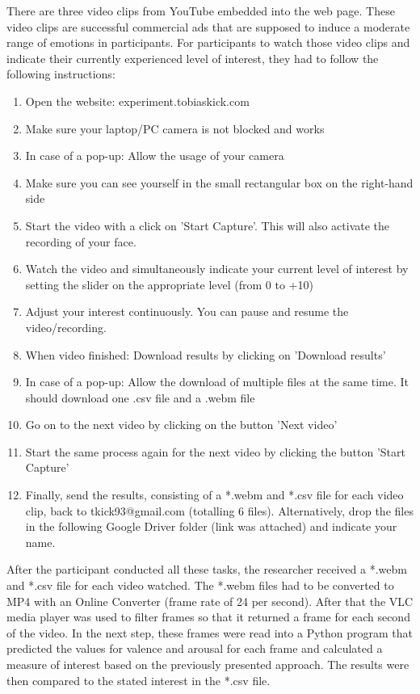 There are three video clips from YouTube embedded into the web page. These video clips are successful commercial ads that are supposed to induce a moderate range of emotions in participants.
\newline\newline
For participants to watch those video clips and indicate their currently experienced level of interest, they had to follow the following instructions:

\begin{enumerate}[noitemsep]
    \item Open the website: experiment.tobiaskick.com
    \item Make sure your laptop/PC camera is not blocked and works
    \item In case of a pop-up: Allow the usage of your camera
    \item Make sure you can see yourself in the small rectangular box on the right-hand side
    \item Start the video with a click on 'Start Capture'. This will also activate the recording of your face.
    \item Watch the video and simultaneously indicate your current level of interest by setting the slider on the appropriate level (from 0 to +10)
    \item Adjust your interest continuously. You can pause and resume the video/recording.
    \item When video finished: Download results by clicking on 'Download results'
    \item In case of a pop-up: Allow the download of multiple files at the same time. It should download one .csv file and a .webm file
    \item Go on to the next video by clicking on the button 'Next video'
    \item Start the same process again for the next video by clicking the button 'Start Capture'
    \item Finally, send the results, consisting of a *.webm and *.csv file for each video clip, back to tkick93@gmail.com (totalling 6 files). Alternatively, drop the files in the following Google Driver folder (link was attached) and indicate your name.
\end{enumerate}

After the participant conducted all these tasks, the researcher received a *.webm and *.csv file for each video watched. The *.webm files had to be converted to MP4 with an Online Converter (frame rate of 24 per second). After that the VLC media player was used to filter frames so that it returned a frame for each second of the video.
\newline\newline
In the next step, these frames were read into a Python program that predicted the values for valence and arousal for each frame and calculated a measure of interest based on the previously presented approach. The results were then compared to the stated interest in the *.csv file.



